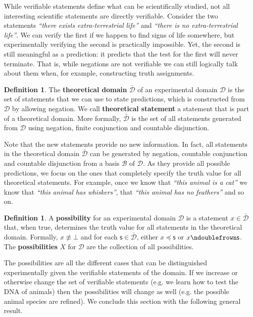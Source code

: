\documentclass[letterpaper]{article}
\theoremstyle{plain}%
\theoremstyle{definition}
\newtheorem{defn}[thrm]{Definition}
\theoremstyle{remark}
\numberwithin{equation}{section}
\def\contradiction{\bot}
\def\ncomp{\ndoublefrown}
\def\narrower{\preccurlyeq}
\newcommand{\edomain}[1][D] {\mathcal{#1}}
\newcommand{\tdomain}[1][D] {\bar{\mathcal{#1}}}
\newcommand{\basis}[1][B] {\mathcal{#1}} %
\newcommand{\statement}[1] {\emph{``#1''}}
\begin{document}
While verifiable statements define what can be scientifically studied, not all interesting scientific statements are directly verifiable. Consider the two statements \statement{there exists extra-terrestrial life} and \statement{there is no extra-terrestrial life}. We can verify the first if we happen to find signs of life somewhere, but experimentally verifying the second is practically impossible. Yet, the second is still meaningful as a prediction: it predicts that the test for the first will never terminate. That is, while negations are not verifiable we can still logically talk about them when, for example, constructing truth assignments.

\begin{defn}
	The \textbf{theoretical domain} $\tdomain$ of an experimental domain $\edomain$ is the set of statements that we can use to state predictions, which is constructed from $\edomain$ by allowing negation. We call \textbf{theoretical statement} a statement that is part of a theoretical domain. More formally, $\tdomain$ is the set of all statements generated from $\edomain$ using negation, finite conjunction and countable disjunction.
\end{defn}

Note that the new statements provide no new information. In fact, all statements in the theoretical domain $\tdomain$ can be generated by negation, countable conjunction and countable disjunction from a basis $\basis$ of $\edomain$. As they provide all possible predictions, we focus on the ones that completely specify the truth value for all theoretical statements. For example, once we know that \statement{this animal is a cat} we know that \statement{this animal has whiskers}, that \statement{this animal has no feathers} and so on.

\begin{defn}
	A \textbf{possibility} for an experimental domain $\edomain$ is a statement $x \in \tdomain$ that, when true, determines the truth value for all statements in the theoretical domain. Formally, $x \nequiv \contradiction$ and for each $\mathsf{s} \in \tdomain$, either $x \narrower \mathsf{s}$ or $x \ncomp \mathsf{s}$. The \textbf{possibilities} $X$ for $\edomain$ are the collection of all possibilities.
\end{defn}

The possibilities are all the different cases that can be distinguished experimentally given the verifiable statements of the domain. If we increase or otherwise change the set of verifiable statements (e.g. we learn how to test the DNA of animals) then the possibilities will change as well (e.g. the possible animal species are refined). We conclude this section with the following general result.
\end{document}
